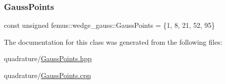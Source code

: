\mbox{\label{classfemus_1_1wedge__gauss_a7e55f855f87c5e6b4a50273eef1dad8e}} 
\subsubsection{\texorpdfstring{Gauss\+Points}{GaussPoints}}
{\footnotesize\ttfamily const unsigned femus\+::wedge\+\_\+gauss\+::\+Gauss\+Points = \{1, 8, 21, 52, 95\}\hspace{0.3cm}{\ttfamily [static]}}



The documentation for this class was generated from the following files\+:\begin{DoxyCompactItemize}
\item 
quadrature/\mbox{\hyperlink{_gauss_points_8hpp}{Gauss\+Points.\+hpp}}\item 
quadrature/\mbox{\hyperlink{_gauss_points_8cpp}{Gauss\+Points.\+cpp}}\end{DoxyCompactItemize}
